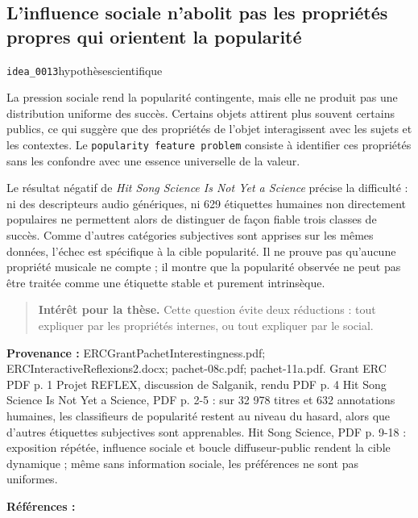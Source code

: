 \documentclass[10pt,a4paper]{article}
\begin{document}
\subsection{L'influence sociale n'abolit pas les propriétés propres qui orientent la popularité}
{\small\color{metadata} \texttt{idea\_0013}\quad\textbullet\quad hypothèse\quad\textbullet\quad scientifique\par}

La pression sociale rend la popularité contingente, mais elle ne produit pas une distribution uniforme des succès. Certains objets attirent plus souvent certains publics, ce qui suggère que des propriétés de l'objet interagissent avec les sujets et les contextes. Le \texttt{popularity feature problem} consiste à identifier ces propriétés sans les confondre avec une essence universelle de la valeur.

Le résultat négatif de \emph{Hit Song Science Is Not Yet a Science} précise la difficulté : ni des descripteurs audio génériques, ni 629 étiquettes humaines non directement populaires ne permettent alors de distinguer de façon fiable trois classes de succès. Comme d'autres catégories subjectives sont apprises sur les mêmes données, l'échec est spécifique à la cible popularité. Il ne prouve pas qu'aucune propriété musicale ne compte ; il montre que la popularité observée ne peut pas être traitée comme une étiquette stable et purement intrinsèque.

\begin{quote}
\textbf{Intérêt pour la thèse.} Cette question évite deux réductions : tout expliquer par les propriétés internes, ou tout expliquer par le social.
\end{quote}
{\footnotesize\color{metadata}\textbf{Provenance :} ERCGrantPachetInterestingness.pdf; ERCInteractiveReflexions2.docx; pachet-08c.pdf; pachet-11a.pdf. Grant ERC PDF p. 1 Projet REFLEX, discussion de Salganik, rendu PDF p. 4 Hit Song Science Is Not Yet a Science, PDF p. 2-5 : sur 32 978 titres et 632 annotations humaines, les classifieurs de popularité restent au niveau du hasard, alors que d'autres étiquettes subjectives sont apprenables. Hit Song Science, PDF p. 9-18 : exposition répétée, influence sociale et boucle diffuseur-public rendent la cible dynamique ; même sans information sociale, les préférences ne sont pas uniformes.\par}
{\footnotesize\color{metadata}\textbf{Références :} \parencite{pachetroy2008hitsong,pachet2011hitsong}\par}
\end{document}

